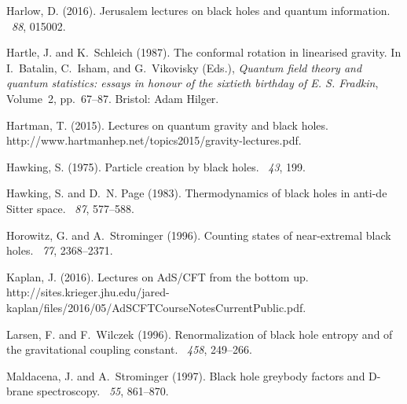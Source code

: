 \documentclass[12pt]{article}
\begin{document}
\begin{thebibliography}{}
Harlow, D. (2016).
\newblock Jerusalem lectures on black holes and quantum information.
~{\em 88}, 015002.

Hartle, J. and K.~Schleich (1987).
\newblock The conformal rotation in linearised gravity.
\newblock In I.~Batalin, C.~Isham, and G.~Vikovisky (Eds.), {\em Quantum field
  theory and quantum statistics: essays in honour of the sixtieth birthday of
  {E}. {S}. {F}radkin}, Volume~2, pp.\  67--87. Bristol: Adam Hilger.

Hartman, T. (2015).
\newblock Lectures on quantum gravity and black holes.
\newblock http://www.hartmanhep.net/topics2015/gravity-lectures.pdf.

Hawking, S. (1975).
\newblock Particle creation by black holes.
~{\em 43}, 199.

Hawking, S. and D.~N. Page (1983).
\newblock Thermodynamics of black holes in anti-de {S}itter space.
~{\em 87}, 577--588.

Horowitz, G. and A.~Strominger (1996).
\newblock Counting states of near-extremal black holes.
~{\em 77}, 2368--2371.

Kaplan, J. (2016).
\newblock Lectures on {A}d{S}/{CFT} from the bottom up.
\newblock
  http://sites.krieger.jhu.edu/jared-kaplan/files/2016/05/AdSCFTCourseNotesCurrentPublic.pdf.

Larsen, F. and F.~Wilczek (1996).
\newblock Renormalization of black hole entropy and of the gravitational
  coupling constant.
~{\em 458}, 249--266.

Maldacena, J. and A.~Strominger (1997).
\newblock Black hole greybody factors and {D}-brane spectroscopy.
~{\em 55}, 861--870.


\end{thebibliography}
\end{document}
